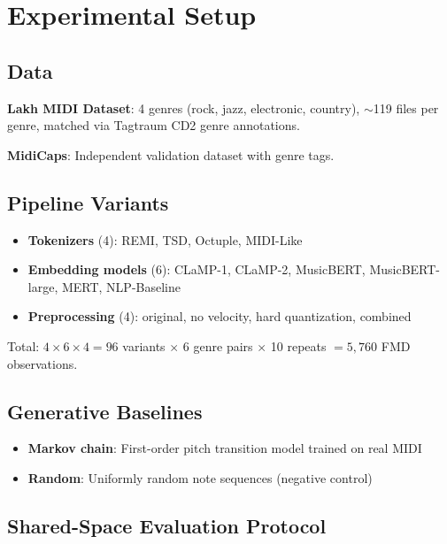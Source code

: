 \documentclass[a4paper]{article}
\begin{document}
\section{Experimental Setup}
\label{sec:setup}

\subsection{Data}

\textbf{Lakh MIDI Dataset}: 4 genres (rock, jazz, electronic, country), $\sim$119 files per genre, matched via Tagtraum CD2 genre annotations.

\textbf{MidiCaps}: Independent validation dataset with genre tags.

\subsection{Pipeline Variants}

\begin{itemize}
    \item \textbf{Tokenizers} (4): REMI, TSD, Octuple, MIDI-Like
    \item \textbf{Embedding models} (6): CLaMP-1, CLaMP-2, MusicBERT, MusicBERT-large, MERT, NLP-Baseline
    \item \textbf{Preprocessing} (4): original, no velocity, hard quantization, combined
\end{itemize}

Total: $4 \times 6 \times 4 = 96$ variants $\times$ 6 genre pairs $\times$ 10 repeats $= 5{,}760$ FMD observations.

\subsection{Generative Baselines}

\begin{itemize}
    \item \textbf{Markov chain}: First-order pitch transition model trained on real MIDI
    \item \textbf{Random}: Uniformly random note sequences (negative control)
\end{itemize}

\subsection{Shared-Space Evaluation Protocol}
\end{document}
